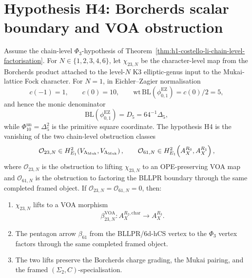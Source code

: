 \section{Hypothesis H4: Borcherds scalar boundary and VOA obstruction}
\label{sec:h4-hkr-borcherds-functorial-lift}

\begin{theorem}
\label{thm:h4-hkr-borcherds-functorial-lift}
Assume the chain-level $\Phi_3$-hypothesis of
Theorem~\ref{thm:h1-costello-li-chain-level-factorisation}.
For \(N\in\{1,2,3,4,6\}\), let \(\chi_{23,N}\) be the
character-level map from the Borcherds product attached to the level-\(N\)
K3 elliptic-genus input to the Mukai-lattice Fock character. For
\(N=1\), in Eichler--Zagier normalisation
\[
 c(-1)=1,\qquad c(0)=10,\qquad
 \mathrm{wt}\,\mathrm{BL}(\phi_{0,1}^{\mathrm{EZ}})=c(0)/2=5,
\]
and hence the monic denominator
\[
 \mathrm{BL}(\phi_{0,1}^{\mathrm{EZ}})=D_5=64^{-1}\Delta_5,
\]
while \(\Phi_{10}^{\mathrm{un}}=\Delta_5^2\) is the primitive square
coordinate.
The hypothesis H4 is the vanishing of the two chain-level obstruction
classes
\[
 \mathcal O_{23,N}\in
 H^2_{E_1}\!\left(V_{\Lambda_{\mathrm{Muk}}},V_{\Lambda_{\mathrm{Muk}}}\right),\qquad
 \mathcal O_{61,N}\in
 H^2_{E_1}\!\left(A_X^{R_6},A_X^{R_1}\right),
\]
where \(\mathcal O_{23,N}\) is the obstruction to lifting
\(\chi_{23,N}\) to an OPE-preserving VOA map and
\(\mathcal O_{61,N}\) is the obstruction to factoring the BLLPR boundary
through the same completed framed object. If
\(\mathcal O_{23,N}=\mathcal O_{61,N}=0\), then:
\begin{enumerate}[label=\textup{(\roman*)}]
 \item \(\chi_{23,N}\) lifts to a VOA morphism
 \[
  \beta_{23,N}^{\mathrm{VOA}}\colon
  A_X^{R_2,\mathrm{char}}\longrightarrow A_X^{R_3}.
 \]
 \item The pentagon arrow \(\beta_{61}\) from the BLLPR/6d-hCS vertex
 to the \(\Phi_3\) vertex factors through the same completed framed
 object.
 \item The two lifts preserve the Borcherds charge grading, the Mukai
 pairing, and the framed \((\Sigma_2,C)\)-specialisation.
\end{enumerate}
\end{theorem}

